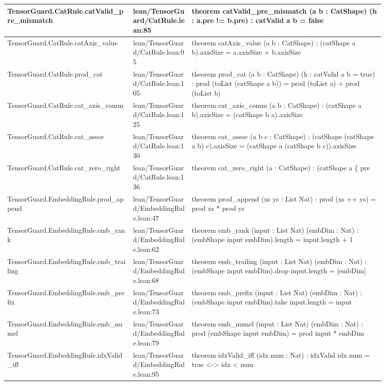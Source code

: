 \documentclass[10pt]{article}
\begin{document}
\begin{longtable}{|p{0.30\linewidth}|p{0.14\linewidth}|p{0.46\linewidth}|}
\hline
TensorGuard.CatRule.catValid\_pre\_mismatch & lean/TensorGuard/CatRule.lean:85 & theorem catValid\_pre\_mismatch (a b : CatShape) (h : a.pre != b.pre) : catValid a b = false \\
\hline
TensorGuard.CatRule.catAxis\_value & lean/TensorGuard/CatRule.lean:95 & theorem catAxis\_value (a b : CatShape) : (catShape a b).axisSize = a.axisSize + b.axisSize \\
\hline
TensorGuard.CatRule.prod\_cat & lean/TensorGuard/CatRule.lean:105 & theorem prod\_cat (a b : CatShape) (h : catValid a b = true) : prod (toList (catShape a b)) = prod (toList a) + prod (toList b) \\
\hline
TensorGuard.CatRule.cat\_axis\_comm & lean/TensorGuard/CatRule.lean:125 & theorem cat\_axis\_comm (a b : CatShape) : (catShape a b).axisSize = (catShape b a).axisSize \\
\hline
TensorGuard.CatRule.cat\_assoc & lean/TensorGuard/CatRule.lean:130 & theorem cat\_assoc (a b c : CatShape) : (catShape (catShape a b) c).axisSize = (catShape a (catShape b c)).axisSize \\
\hline
TensorGuard.CatRule.cat\_zero\_right & lean/TensorGuard/CatRule.lean:136 & theorem cat\_zero\_right (a : CatShape) : (catShape a \{ pre \\
\hline
TensorGuard.EmbeddingRule.prod\_append & lean/TensorGuard/EmbeddingRule.lean:47 & theorem prod\_append (xs ys : List Nat) : prod (xs ++ ys) = prod xs * prod ys \\
\hline
TensorGuard.EmbeddingRule.emb\_rank & lean/TensorGuard/EmbeddingRule.lean:62 & theorem emb\_rank (input : List Nat) (embDim : Nat) : (embShape input embDim).length = input.length + 1 \\
\hline
TensorGuard.EmbeddingRule.emb\_trailing & lean/TensorGuard/EmbeddingRule.lean:68 & theorem emb\_trailing (input : List Nat) (embDim : Nat) : (embShape input embDim).drop input.length = [embDim] \\
\hline
TensorGuard.EmbeddingRule.emb\_prefix & lean/TensorGuard/EmbeddingRule.lean:73 & theorem emb\_prefix (input : List Nat) (embDim : Nat) : (embShape input embDim).take input.length = input \\
\hline
TensorGuard.EmbeddingRule.emb\_numel & lean/TensorGuard/EmbeddingRule.lean:79 & theorem emb\_numel (input : List Nat) (embDim : Nat) : prod (embShape input embDim) = prod input * embDim \\
\hline
TensorGuard.EmbeddingRule.idxValid\_iff & lean/TensorGuard/EmbeddingRule.lean:95 & theorem idxValid\_iff (idx num : Nat) : idxValid idx num = true <-> idx < num \\

\end{longtable}
\end{document}
